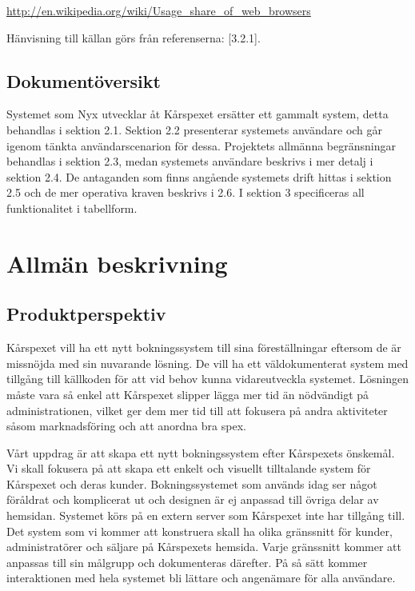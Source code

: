 \documentclass[a4paper, twoside, 11pt, titlepage]{article}
\begin{document}
		\url{http://en.wikipedia.org/wiki/Usage\_share\_of\_web_browsers}

		Hänvisning till källan görs från referenserna: [3.2.1].

	\subsection{Dokumentöversikt}


	Systemet som Nyx utvecklar åt Kårspexet ersätter ett gammalt system, detta behandlas i sektion 2.1. Sektion 2.2 presenterar systemets användare och går igenom tänkta användarscenarion för dessa. Projektets allmänna begränsningar behandlas i sektion 2.3, medan systemets användare beskrivs i mer detalj i sektion 2.4. De antaganden som finns angående systemets drift hittas i sektion 2.5 och de mer operativa kraven beskrivs i 2.6. I sektion 3 specificeras all funktionalitet i tabellform.

\clearpage
\section{Allmän beskrivning}



	\subsection{Produktperspektiv}


	Kårspexet vill ha ett nytt bokningssystem till sina föreställningar eftersom de är missnöjda med sin nuvarande lösning. De vill ha ett väldokumenterat system med tillgång till källkoden för att vid behov kunna vidareutveckla systemet. Lösningen måste vara så enkel att Kårspexet slipper lägga mer tid än nödvändigt på administrationen, vilket ger dem mer tid till att fokusera på andra aktiviteter såsom marknadsföring och att anordna bra spex.

	Vårt uppdrag är att skapa ett nytt bokningssystem efter Kårspexets önskemål. Vi skall fokusera på att skapa ett enkelt och visuellt tilltalande system för Kårspexet och deras kunder. Bokningssystemet som används idag ser något föråldrat och komplicerat ut och designen är ej anpassad till övriga delar av hemsidan. Systemet körs på en extern server som Kårspexet inte har tillgång till. Det system som vi kommer att konstruera skall ha olika gränssnitt för kunder, administratörer och säljare på Kårspexets hemsida. Varje gränssnitt kommer att anpassas till sin målgrupp och dokumenteras därefter. På så sätt kommer interaktionen med hela systemet bli lättare och angenämare för alla användare.
\end{document}
